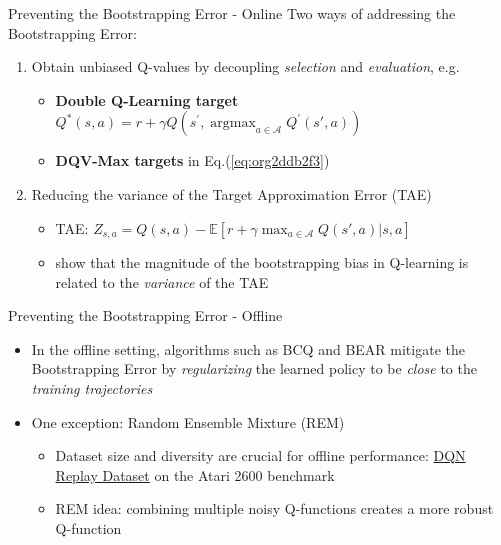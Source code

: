 \documentclass[presentation]{beamer}
\begin{document}
\begin{frame}[label={sec:orgb925272}]{Preventing the Bootstrapping Error - Online}
Two ways of addressing the Bootstrapping Error:
\vspace{1mm}
\begin{enumerate}
\item Obtain unbiased Q-values by decoupling \emph{selection} and
\emph{evaluation}, e.g.
\begin{itemize}
\item \textbf{Double Q-Learning target}\cite{van2016deep} \\
\vspace{1mm}
\(Q^{*}\left(s, a\right) = r +\gamma Q\left(s^{\prime},
     \operatorname{argmax}_{a \in \mathcal{A}} Q^{\prime}\left(s', a \right)\right)\)
\vspace{1mm}
\item \textbf{DQV-Max targets} in Eq.(\ref{eq:org2ddb2f3}) \\

\vspace{1mm}
\end{itemize}
\item Reducing the variance of the Target Approximation Error (TAE)\cite{anschel2017averaged}
\vspace{1mm}
\begin{itemize}
\item TAE: \(Z_{s, a} = Q(s, a) - \mathbb{E}[r + \gamma \max_{a \in \mathcal{A}} Q(s', a) \vert s, a]\)
\vspace{1mm}
\item \citeauthor{anschel2017averaged} show that the magnitude of the
bootstrapping bias in Q-learning is related to the \emph{variance} of
the TAE
\end{itemize}
\end{enumerate}
\end{frame}

\begin{frame}[label={sec:org9861c8b}]{Preventing the Bootstrapping Error - Offline}
\begin{itemize}
\item In the offline setting, algorithms such as BCQ\cite{fujimoto2019off}
and BEAR\cite{kumar2019stabilizing} mitigate the Bootstrapping Error
by \emph{regularizing} the learned policy to be \emph{close} to the \emph{training
trajectories}
\item One exception: Random Ensemble Mixture
(REM)\cite{agarwal2020optimistic}
\begin{itemize}
\item Dataset \alert{size} and \alert{diversity} are crucial for offline
performance: \href{https://research.google/tools/datasets/dqn-replay/}{DQN Replay Dataset} on the Atari 2600 benchmark
\item REM idea: combining multiple noisy Q-functions creates a more
robust Q-function
\end{itemize}
\end{itemize}
\end{frame}
\end{document}
